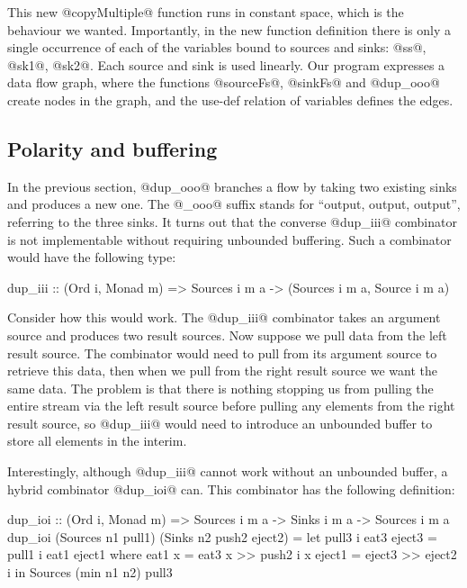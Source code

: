 This new @copyMultiple@ function runs in constant space, which is the behaviour we wanted. Importantly, in the new function definition there is only a single occurrence of each of the variables bound to sources and sinks: @ss@, @sk1@, @sk2@. Each source and sink is used linearly. Our program expresses a data flow graph, where the functions @sourceFs@, @sinkFs@ and @dup_ooo@ create nodes in the graph, and the use-def relation of variables defines the edges.


\subsection{Polarity and buffering}
In the previous section, @dup_ooo@ branches a flow by taking two existing sinks and produces a new one. The @_ooo@ suffix stands for ``output, output, output'', referring to the three sinks. It turns out that the converse @dup_iii@ combinator is not implementable without requiring unbounded buffering. Such a combinator would have the following type:
\begin{code}
 dup_iii :: (Ord i, Monad m)
         =>  Sources i m a 
         -> (Sources i m a, Source i m a)
\end{code}

Consider how this would work. The @dup_iii@ combinator takes an argument source and produces two result sources. Now suppose we pull data from the left result source. The combinator would need to pull from its argument source to retrieve this data, then when we pull from the right result source we want the same data. The problem is that there is nothing stopping us from pulling the entire stream via the left result source before pulling any elements from the right result source, so @dup_iii@ would need to introduce an unbounded buffer to store all elements in the interim.

Interestingly, although @dup_iii@ cannot work without an unbounded buffer, a hybrid combinator @dup_ioi@ can. This combinator has the following definition:
\begin{code}
dup_ioi :: (Ord i, Monad m)
        => Sources i m a -> Sinks i m a 
        -> Sources i m a
dup_ioi (Sources n1 pull1) (Sinks n2 push2 eject2)
 = let pull3 i eat3 eject3
        = pull1 i eat1 eject1
        where eat1 x = eat3 x >> push2  i x
              eject1 = eject3 >> eject2 i
   in  Sources (min n1 n2) pull3
\end{code}

